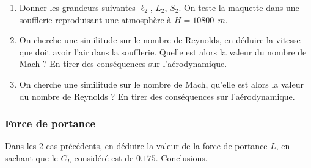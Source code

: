 {   \begin{enumerate}
   \item Donner les grandeurs suivantes $\ell_2$, $L_2$, $S_2$.
    On teste la maquette dans une soufflerie reproduisant une atmosphère
   à $H=10800 \ \  m$. 
   
    \item On cherche une similitude sur le nombre de Reynolds, en déduire la vitesse
   que doit avoir l'air dans la soufflerie. Quelle est alors la valeur du nombre
   de Mach ? En tirer des conséquences sur l'aérodynamique.
   
   \item  On cherche une similitude sur le nombre de Mach, qu'elle est alors
   la valeur du nombre de Reynolds ? En tirer des conséquences sur l'aérodynamique.
   \end{enumerate}
 
 
 
 \subsubsection {   Force de portance}
 Dans les 2 cas précédents,  en déduire la valeur
 de la force de portance $L$, en sachant que le $C_L$ considéré est de $0.175$.
 Conclusions. 
 }

